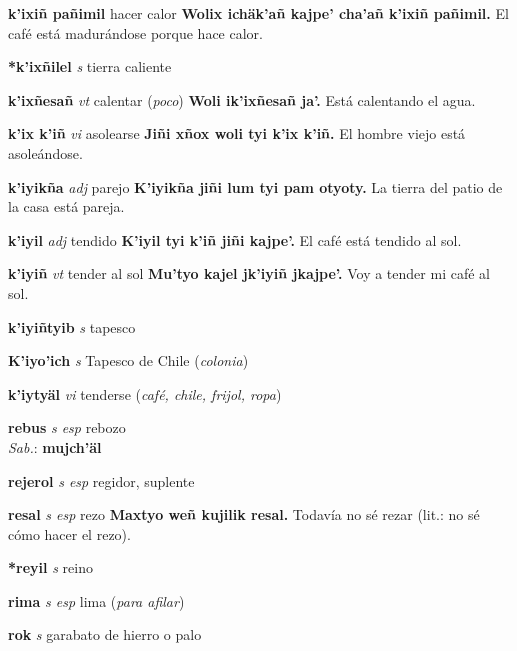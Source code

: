 \documentclass[10pt]{scrbook}
\newcommand{\entry}[1]{\textbf{#1}}
\newcommand{\alphaletter}[1]{\end{multicols}\addsec{#1}\begin{multicols}{2}}
\newcommand{\partofspeech}[1]{\textit{#1}}
\newcommand{\spanishtranslation}[1]{#1}
\newcommand{\clarification}[1]{(\textit{#1})}
\newcommand{\cholexample}[1]{\textbf{#1}}
\newcommand{\exampletranslation}[1]{#1}
\newcommand{\dialectvariant}[1]{\\\textit{#1}:}
\newcommand{\dialectword}[1]{\textbf{#1}}
\begin{document}
\begin{multicols}{2}
\entry{k'ixiñ pañimil}
\spanishtranslation{hacer calor}
\cholexample{Wolix ichäk'añ kajpe' cha'añ k'ixiñ pañimil.}
\exampletranslation{El café está madurándose porque hace calor.}

\entry{*k'ixñilel}
\partofspeech{s}
\spanishtranslation{tierra caliente}

\entry{k'ixñesañ}
\partofspeech{vt}
\spanishtranslation{calentar}
\clarification{poco}
\cholexample{Woli ik'ixñesañ ja'.}
\exampletranslation{Está calentando el agua.}

\entry{k'ix k'iñ}
\partofspeech{vi}
\spanishtranslation{asolearse}
\cholexample{Jiñi xñox woli tyi k'ix k'iñ.}
\exampletranslation{El hombre viejo está asoleándose.}

\entry{k'iyikña}
\partofspeech{adj}
\spanishtranslation{parejo}
\cholexample{K'iyikña jiñi lum tyi pam otyoty.}
\exampletranslation{La tierra del patio de la casa está pareja.}

\entry{k'iyil}
\partofspeech{adj}
\spanishtranslation{tendido}
\cholexample{K'iyil tyi k'iñ jiñi kajpe'.}
\exampletranslation{El café está tendido al sol.}

\entry{k'iyiñ}
\partofspeech{vt}
\spanishtranslation{tender al sol}
\cholexample{Mu'tyo kajel jk'iyiñ jkajpe'.}
\exampletranslation{Voy a tender mi café al sol.}

\entry{k'iyiñtyib}
\partofspeech{s}
\spanishtranslation{tapesco}

\entry{K'iyo'ich}
\partofspeech{s}
\spanishtranslation{Tapesco de Chile}
\clarification{colonia}

\entry{k'iytyäl}
\partofspeech{vi}
\spanishtranslation{tenderse}
\clarification{café, chile, frijol, ropa}

\alphaletter{R}

\entry{rebus}
\partofspeech{s esp}
\spanishtranslation{rebozo}
\dialectvariant{Sab.}
\dialectword{mujch'äl}

\entry{rejerol}
\partofspeech{s esp}
\spanishtranslation{regidor, suplente}

\entry{resal}
\partofspeech{s esp}
\spanishtranslation{rezo}
\cholexample{Maxtyo weñ kujilik resal.}
\exampletranslation{Todavía no sé rezar (lit.: no sé cómo hacer el rezo).}

\entry{*reyil}
\partofspeech{s}
\spanishtranslation{reino}

\entry{rima}
\partofspeech{s esp}
\spanishtranslation{lima}
\clarification{para afilar}

\entry{rok}
\partofspeech{s}
\spanishtranslation{garabato de hierro o palo}


\end{multicols}
\end{document}
